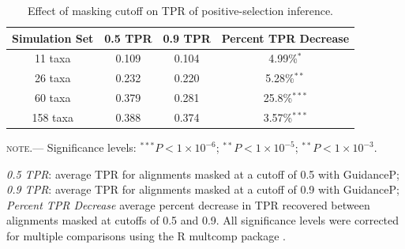 \documentclass[10pt]{article}
\begin{document}
\begin{table}
\caption {\label{tab:cutoffs} Effect of masking cutoff on TPR of positive-selection inference.}
\begin{tabular}{c c c c}
\hline\noalign{\smallskip}
Simulation Set & 0.5 TPR & 0.9 TPR & Percent TPR Decrease \\ 
\hline\noalign{\smallskip}
11 taxa & 0.109 & 0.104 & 4.99\%$^{\ast}$\\ 
26 taxa & 0.232 & 0.220 & 5.28\%$^{\ast\ast}$\\
60 taxa & 0.379 & 0.281 & 25.8\%$^{\ast\ast\ast}$\\
158 taxa & 0.388 & 0.374  & 3.57\%$^{\ast\ast\ast}$\\
\hline
\end{tabular}
\newline
\textsc{note.}--- Significance levels: $^{\ast\ast\ast} P < 1\times10^{-6}$; $^{\ast\ast} P < 1\times10^{-5}$; $^{\ast\ast} P < 1\times10^{-3}$. 

\textit{0.5 TPR}: average TPR for alignments masked at a cutoff of 0.5 with GuidanceP; \textit{0.9 TPR}: average TPR for alignments masked at a cutoff of 0.9 with GuidanceP; \textit{Percent TPR Decrease} average percent decrease in TPR recovered between alignments masked at cutoffs of 0.5 and 0.9. All significance levels were corrected for multiple comparisons using the R multcomp package \citep{Hothorn2008}.
\end{table}



	
\end{document}
